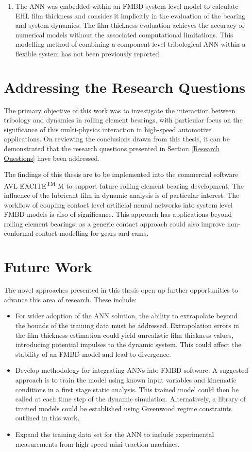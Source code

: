 \begin{enumerate}
	\item The ANN was embedded within an FMBD system-level model to calculate EHL film thickness and consider it implicitly in the evaluation of the bearing and system dynamics. The film thickness evaluation achieves the accuracy of numerical models without the associated computational limitations. This modelling method of combining a component level tribological ANN within a flexible system has not been previously reported.
\end{enumerate}

\section{Addressing the Research Questions}
The primary objective of this work was to investigate the interaction between tribology and dynamics in rolling element bearings, with particular focus on the significance of this multi-physics interaction in high-speed automotive applications. On reviewing the conclusions drawn from this thesis, it can be demonstrated that the research questions presented in Section \ref{Research Questions} have been addressed.

The findings of this thesis are to be implemented into the commercial software AVL EXCITE\textsuperscript{TM} M to support future rolling element bearing development. The influence of the lubricant film in dynamic analysis is of particular interest. The workflow of coupling contact level artificial neural networks into system level FMBD models is also of significance. This approach has applications beyond rolling element bearings, as a generic contact approach could also improve non-conformal contact modelling for gears and cams.

\section{Future Work}

The novel approaches presented in this thesis open up further opportunities to advance this area of research. These include:

\begin{itemize}
	\item For wider adoption of the ANN solution, the ability to extrapolate beyond the bounds of the training data must be addressed. Extrapolation errors in the film thickness estimation could yield unrealistic film thickness values, introducing potential impulses to the dynamic system. This could  affect the stability of an FMBD model and lead to divergence.
	\item Develop methodology for integrating ANNs into FMBD software. A suggested approach is to train the model using known input variables and kinematic conditions in a first stage static analysis. This trained model could then be called at each time step of the dynamic simulation. Alternatively, a library of trained models could be established using Greenwood regime constraints outlined in this work.
	\item Expand the training data set for the ANN to include experimental measurements from high-speed mini traction machines.
\end{itemize}